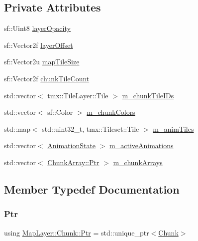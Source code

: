 \subsection*{Private Attributes}
\begin{DoxyCompactItemize}
\item 
sf\+::\+Uint8 \hyperlink{classMapLayer_1_1Chunk_a2540be672f38d7f6826eebb944881429}{layer\+Opacity}
\item 
sf\+::\+Vector2f \hyperlink{classMapLayer_1_1Chunk_a58aafb7ea1d939755673bef91bfe313e}{layer\+Offset}
\item 
sf\+::\+Vector2u \hyperlink{classMapLayer_1_1Chunk_a010215bc42e515278da75b680c88dcdf}{map\+Tile\+Size}
\item 
sf\+::\+Vector2f \hyperlink{classMapLayer_1_1Chunk_a48d8fc51f7358f229818659ae7869485}{chunk\+Tile\+Count}
\item 
std\+::vector$<$ tmx\+::\+Tile\+Layer\+::\+Tile $>$ \hyperlink{classMapLayer_1_1Chunk_ab40e4c80d3c205fc62db6a1c90e6afe7}{m\+\_\+chunk\+Tile\+I\+Ds}
\item 
std\+::vector$<$ sf\+::\+Color $>$ \hyperlink{classMapLayer_1_1Chunk_ab09b61a5d77f4acad152ac60db3cd333}{m\+\_\+chunk\+Colors}
\item 
std\+::map$<$ std\+::uint32\+\_\+t, tmx\+::\+Tileset\+::\+Tile $>$ \hyperlink{classMapLayer_1_1Chunk_a70854589957a8232358b04f971c1a1ec}{m\+\_\+anim\+Tiles}
\item 
std\+::vector$<$ \hyperlink{structMapLayer_1_1AnimationState}{Animation\+State} $>$ \hyperlink{classMapLayer_1_1Chunk_a8b618ddd7286a02a668fb9f8404427b6}{m\+\_\+active\+Animations}
\item 
std\+::vector$<$ \hyperlink{classMapLayer_1_1Chunk_1_1ChunkArray_a6d944dee2fc89a76d7a252405e2732b0}{Chunk\+Array\+::\+Ptr} $>$ \hyperlink{classMapLayer_1_1Chunk_ab264049d7a576a9b8efd88df159704bf}{m\+\_\+chunk\+Arrays}
\end{DoxyCompactItemize}


\subsection{Member Typedef Documentation}
\mbox{\label{classMapLayer_1_1Chunk_ab1df4d3621c5d9f83c2edb46d0744078}} 
\subsubsection{\texorpdfstring{Ptr}{Ptr}}
{\footnotesize\ttfamily using \hyperlink{classMapLayer_1_1Chunk_ab1df4d3621c5d9f83c2edb46d0744078}{Map\+Layer\+::\+Chunk\+::\+Ptr} =  std\+::unique\+\_\+ptr$<$\hyperlink{classMapLayer_1_1Chunk}{Chunk}$>$}

